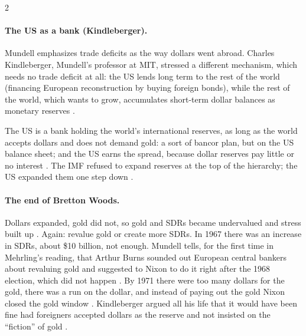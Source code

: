 \begin{paracol}{2}
\paragraph{The US as a bank (Kindleberger).} Mundell emphasizes trade deficits as the way dollars went abroad. Charles Kindleberger, Mundell's professor at MIT,
stressed a different mechanism, which needs no trade deficit at all: the US lends long term to the rest of the world (financing European reconstruction by
buying foreign bonds), while the rest of the world, which wants to grow, accumulates short-term dollar balances as monetary reserves
.

\begin{nfigure}
\begin{taccts}
\qquad
{}
\end{taccts}
\caption{Kindleberger's view: the US as a bank to the world, borrowing short and lending long, with no net capital or trade flow .}\label{fig:intl-usbank}
\end{nfigure}

The US is a bank holding the world's international reserves, as long as the world accepts dollars and does not demand gold: a sort of bancor plan, but on the
US balance sheet; and the US earns the spread, because dollar reserves pay little or no interest .
The IMF refused to expand reserves at the top of the hierarchy; the US expanded them one step down .

\paragraph{The end of Bretton Woods.} Dollars expanded, gold did not, so gold and SDRs became undervalued and stress built up .
Again: revalue gold or create more SDRs. In 1967 there was an increase in SDRs, about \$10 billion, not enough. Mundell tells, for the first time in Mehrling's
reading, that Arthur Burns sounded out European central bankers about revaluing gold and suggested to Nixon to do it right after the 1968 election, which did
not happen . By 1971 there were too many dollars for the gold, there was a run on the dollar, and
instead of paying out the gold Nixon closed the gold window . Kindleberger argued all his life that it would have
been fine had foreigners accepted dollars as the reserve and not insisted on the ``fiction'' of gold .


\end{paracol}
